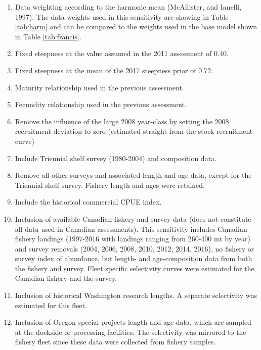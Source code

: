 \documentclass[12pt,]{article}
\begin{document}
\begin{enumerate}

  \item Data weighting according to the harmonic mean (McAllister, and Ianelli, 1997).  The data weights used in this sensitivity are showing in Table \ref{tab:harm} and can be compared to the weights used in the base model shown in Table \ref{tab:francis}.
  
  \item Fixed steepness at the value assumed in the 2011 assessment of 0.40.
  
  \item Fixed steepness at the mean of the 2017 steepness prior of 0.72.
  
  \item Maturity relationship used in the previous assessment.
  
  \item Fecundity relationship used in the previous assessment.
  
  \item Remove the influence of the large 2008 year-class by setting the 2008 recruitment deviation to zero (estimated straight from the stock recruitment curve)
  
  \item Include Triennial shelf survey (1980-2004) and composition data.
  
  \item Remove all other surveys and associated length and age data, except for the Triennial shelf survey.  Fishery length and ages were retained.  
  
  \item Include the historical commercial CPUE index.
  
  \item Inclusion of available Canadian fishery and survey data (does not constitute all data used in Canadian assessments).  This sensitivity includes Canadian fishery landings (1997-2016 with landings ranging from 260-400 mt by year) and survey removals (2004, 2006, 2008, 2010, 2012, 2014, 2016), no fishery or survey index of abundance, but length- and age-composition data from both the fishery and survey.  Fleet specific selectivity curves were estimated for the Canadian fishery and the survey.  
  
  \item Inclusion of historical Washington research lengths.  A separate selectivity was estimated for this fleet.   
  
  \item Inclusion of Oregon special projects length and age data, which are sampled at the dockside or processing facilities.  The selectivity was mirrored to the fishery fleet since these data were collected from fishery samples.
  
\end{enumerate}
\end{document}
